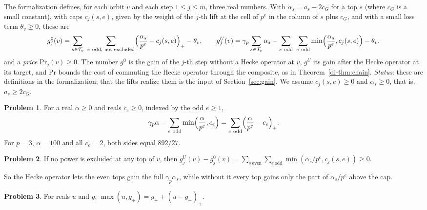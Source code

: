 \documentclass[reqno]{amsart}
\theoremstyle{definition}
\newtheorem{problem}{Problem}[section]
\theoremstyle{plain}
\theoremstyle{remark}
\newcommand{\Tc}{\mathcal T}
\renewcommand{\Pr}{\mathrm{Pr}}
\begin{document}
The formalization defines, for each orbit \(v\) and each step \(1\le j\le m\), three real numbers.  With \(\alpha_s=a_s-2c_G\) for a top \(s\) (where \(c_G\) is a small constant), with caps \(c_j(s,e)\), given by the weight of the \(j\)-th lift at the cell of \(p^e\) in the column of \(s\) plus \(c_G\), and with a small loss term \(\theta_v\ge0\), these are
\[
 g^0_j(v)=\sum_{s\in\Tc_v}\ \sum_{e\ \text{odd, not excluded}}\Bigl(\frac{\alpha_s}{p^e}-c_j(s,e)\Bigr)_+-\theta_v ,\qquad
 g^U_j(v)=\gamma_p\sum_{s\in\Tc_v}\alpha_s-\sum_{s\ \text{odd}}\ \sum_{e\ \text{odd}}\min\Bigl(\frac{\alpha_s}{p^e},c_j(s,e)\Bigr)-\theta_v ,
\]
and a \emph{price} \(\Pr_j(v)\ge0\).  The number \(g^0\) is the gain of the \(j\)-th step without a Hecke operator at \(v\), \(g^U\) its gain after the Hecke operator at its target, and \(\Pr\) bounds the cost of commuting the Hecke operator through the composite, as in Theorem~\ref{di-thm:chain}.  \emph{Status}: these are definitions in the formalization; that the lifts realize them is the input of Section~\ref{sec:gain}.  We assume \(c_j(s,e)\ge0\) and \(\alpha_s\ge0\), that is, \(a_s\ge2c_G\).

\begin{problem}\label{pr:gamma}
For a real \(\alpha\ge0\) and reals \(c_e\ge0\), indexed by the odd \(e\ge1\),
\[
 \gamma_p\alpha-\sum_{e\ \text{odd}}\min\Bigl(\frac\alpha{p^e},c_e\Bigr)=\sum_{e\ \text{odd}}\Bigl(\frac\alpha{p^e}-c_e\Bigr)_+ .
\]
For \(p=3\), \(\alpha=100\) and all \(c_e=2\), both sides equal \(892/27\).
\end{problem}

\begin{problem}\label{pr:even-gain}
If no power is excluded at any top of \(v\), then
\(g^U_j(v)-g^0_j(v)=\sum_{s\ \text{even}}\sum_{e\ \text{odd}}\min(\alpha_s/p^e,c_j(s,e))\ge0\).
\end{problem}

So the Hecke operator lets the even tops gain the full \(\gamma_p\alpha_s\), while without it every top gains only the part of \(\alpha_s/p^e\) above the cap.

\begin{problem}\label{pr:max}
For reals \(u\) and \(g\), \(\max(u,g_+)=g_++(u-g_+)_+\).
\end{problem}
\end{document}
